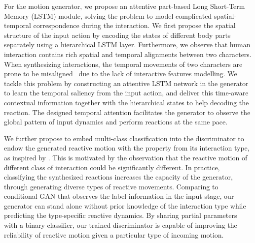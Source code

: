 \documentclass[times,twocolumn,final]{elsarticle}
\begin{document}
For the motion generator, we propose an attentive part-based Long Short-Term Memory (LSTM) module, solving the problem to model complicated spatial-temporal correspondence during the interaction. We first propose the spatial structure of the input action by encoding the states of different body parts separately using a hierarchical LSTM layer. Furthermore, we observe that human interaction contains rich spatial and temporal alignments between two characters. When synthesizing interactions, the temporal movements of two characters are prone to be misaligned~\cite{huang2014action,shu2016learning} due to the lack of interactive features modelling. We tackle this problem by constructing an attentive LSTM network in the generator to learn the temporal saliency from the input action, and deliver this time-aware contextual information together with the hierarchical states to help decoding the reaction. The designed temporal attention facilitates the generator to observe the global pattern of input dynamics and perform reactions at the same pace. 


We further propose to embed multi-class classification into the discriminator to endow the generated reactive motion with the property from its interaction type, as inspired by \cite{odena2016semi, kumar2017semi}. This is motivated by the observation that the reactive motion of different class of interaction could be significantly different. In practice, classifying the synthesized reactions increases the capacity of the generator, through generating diverse types of reactive movements. Comparing to conditional GAN that observes the label information in the input stage, our generator can stand alone without prior knowledge of the interaction type while predicting the type-specific reactive dynamics. By sharing partial parameters with a binary classifier, our trained discriminator is capable of improving the reliability of reactive motion given a particular type of incoming motion.




\end{document}
